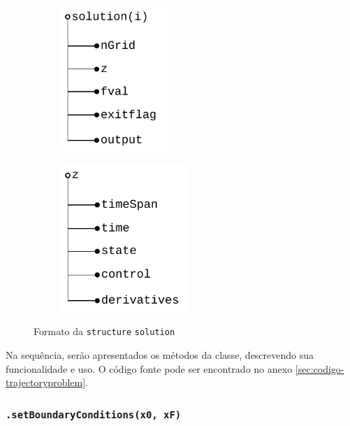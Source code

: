 \begin{figure}[H]
    \centering
    \begin{subfigure}{0.49\linewidth}
    \centering
        \includegraphics[width=0.45\textwidth]{Cap3/figuras/TrajectoryProblem-solution.pdf}
    \end{subfigure}
    \hfill
    \begin{subfigure}{0.49\linewidth}
    \centering
        \includegraphics[width=0.52\textwidth]{Cap3/figuras/TrajectoryProblem-solution-z.pdf}
    \end{subfigure}
    \caption{Formato da \texttt{structure} \texttt{solution}}
    \label{fig:solution}
\end{figure}

Na sequência, serão apresentados os métodos da classe, descrevendo sua funcionalidade e uso. O código fonte pode ser encontrado no anexo \ref{sec:codigo-trajectoryproblem}.

\subsubsection{\texttt{.setBoundaryConditions(x0, xF)}}
\label{subsubsec:setboundaryconditions}

